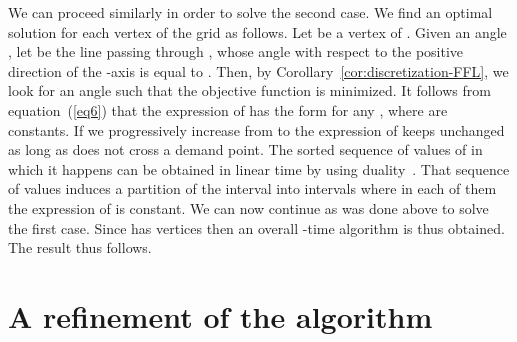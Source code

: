 \documentclass[11pt,a4paper,oneside,onecolumn]{article}
\def\QED{\ensuremath{{\square}}}
\def\markatright#1{\leavevmode\unskip\nobreak\quad\hspace*{\fill}{#1}}
\newenvironment{proof}
{\begin{trivlist}\item[\hskip\labelsep{\bf Proof.}]}
{\markatright{\QED}\end{trivlist}}
\begin{document}
\begin{proof}
We can proceed similarly in order to solve the second case. We find
an optimal solution  for each vertex  of the grid  as
follows. Let  be a vertex of . Given an angle , let
 be the line passing through , whose angle with
respect to the positive direction of the -axis is equal to
. Then, by Corollary~\ref{cor:discretization-FFL}, we look
for an angle  such that the
objective function  is minimized. It follows
from equation~(\ref{eq6}) that the expression of
 has the form
 for any
, where  are
constants. If we progressively increase  from  to
 the expression of  keeps
unchanged as long as  does not cross a demand point. The
sorted sequence of values of  in which it happens can be
obtained in linear time by using duality~\cite{o-rourke98}. That
sequence of values induces a partition of the interval
 into intervals where in each of them the
expression of  is constant. We can now continue
as was done above to solve the first case. Since  has 
vertices then an overall -time algorithm is thus obtained.
The result thus follows.
\end{proof}

\section{A refinement of the
algorithm}\label{section:refinement}
\end{document}
